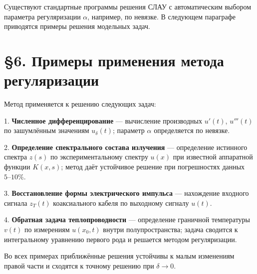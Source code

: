 \documentclass[a4paper,14pt]{extarticle}
\begin{document}
Существуют стандартные программы решения СЛАУ с автоматическим выбором параметра регуляризации \(\alpha\), например, по невязке. В следующем параграфе приводятся примеры решения модельных задач.

\section{\S 6. Примеры применения метода регуляризации}

Метод применяется к решению следующих задач:

1. \textbf{Численное дифференцирование} --- вычисление производных $u'(t)$, $u'''(t)$ по зашумлённым значениям $u_\delta(t)$; параметр $\alpha$ определяется по невязке.

2. \textbf{Определение спектрального состава излучения} --- определение истинного спектра $z(s)$ по экспериментальному спектру $u(x)$ при известной аппаратной функции $K(x,s)$; метод даёт устойчивое решение при погрешностях данных $5\text{--}10\%$.

3. \textbf{Восстановление формы электрического импульса} --- нахождение входного сигнала $z_T(t)$ коаксиального кабеля по выходному сигналу $u(t)$.

4. \textbf{Обратная задача теплопроводности} --- определение граничной температуры $v(t)$ по измерениям $u(x_0,t)$ внутри полупространства; задача сводится к интегральному уравнению первого рода и решается методом регуляризации.

Во всех примерах приближённые решения устойчивы к малым изменениям правой части и сходятся к точному решению при $\delta \to 0$.
\end{document}
